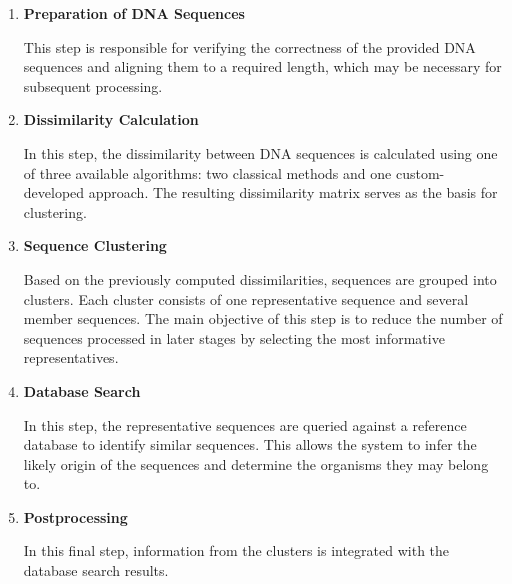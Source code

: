 \documentclass[pdflatex,sn-vancouver-num]{sn-jnl}%
\begin{document}
        \begin{enumerate}
            \item {
                \textbf{Preparation of DNA Sequences}
        
                This step is responsible for verifying the correctness of the provided DNA sequences and aligning them to a required length, which may be necessary for subsequent processing.
            }
            \item {
                \textbf{Dissimilarity Calculation}
        
                In this step, the dissimilarity between DNA sequences is calculated using one of three available algorithms: two classical methods and one custom-developed approach. The resulting dissimilarity matrix serves as the basis for clustering.
            }
            \item {
                \textbf{Sequence Clustering}
        
                Based on the previously computed dissimilarities, sequences are grouped into clusters. Each cluster consists of one representative sequence and several member sequences. The main objective of this step is to reduce the number of sequences processed in later stages by selecting the most informative representatives.
            }
            \item {
                \textbf{Database Search}
        
                In this step, the representative sequences are queried against a reference database to identify similar sequences. This allows the system to infer the likely origin of the sequences and determine the organisms they may belong to.
            }
            \item {
                \textbf{Postprocessing}
        
                In this final step, information from the clusters is integrated with the database search results.
            }
        \end{enumerate}
        
\end{document}
